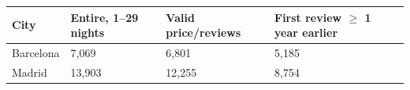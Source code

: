 \begin{tabular}{llll}
\toprule
City & Entire, 1--29 nights & Valid price/reviews & First review $\geq$ 1 year earlier \\
\midrule
Barcelona & 7,069 & 6,801 & 5,185 \\
Madrid & 13,903 & 12,255 & 8,754 \\
\bottomrule
\end{tabular}
